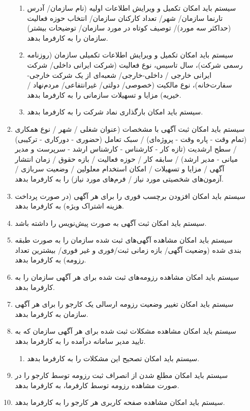 \documentclass[12pt]{article}
\begin{document}
\begin{itemize}
\begin{enumerate}
\begin{enumerate}
				\item سیستم باید امکان تکمیل و ویرایش اطلاعات اولیه (نام سازمان/ آدرس تارنما سازمان/ شهر/ تعداد کارکنان سازمان/ انتخاب حوزه فعالیت (حداکثر سه مورد)/ توصیف کوتاه در مورد سازمان/ توضیحات بیشتر) سازمان را به کارفرما بدهد.
				\item سیستم باید امکان تکمیل و ویرایش اطلاعات تکمیلی سازمان (روزنامه رسمی شرکت)، سال تاسیس، نوع فعالیت (شرکت ایرانی داخلی/ شرکت ایرانی خارجی / داخلی-خارجی/ شعبه‌ای از یک شرکت خارجی-سفارت‌خانه)، نوع مالکیت (خصوصی/ دولتی/ غیرانتفاعی/ مردم‌نهاد / خیریه) مزایا و تسهیلات سازمانی را به کارفرما بدهد.
				\item سیستم باید امکان بارگذاری نماد شرکت را به کارفرما بدهد.
			\end{enumerate}
			\item سیستم باید امکان ثبت آگهی با مشخصات (عنوان شغلی / شهر / نوع همکاری (تمام وقت - پاره وقت - پروژه‌ای) / سبک تعامل (حضوری - دورکاری - ترکیبی) / سطح ارشدیت (تازه کار - کارشناس - کارشناس ارشد - سرپرست و مدیر میانی - مدیر ارشد) / سابقه کار / حوزه فعالیت / بازه حقوق / زمان انتشار آگهی / مزایا و تسهیلات / امکان استخدام معلولین / وضعیت سربازی / آزمون‌های شخصیتی مورد نیاز / فرم‌های مورد نیاز) را به کارفرما بدهد.
			\item سیستم باید امکان افزودن برچسب فوری را برای هر آگهی (در صورت پرداخت هزینه اشتراک ویژه) به کارفرما بدهد.
			\item سیستم باید امکان ثبت آگهی به صورت پیش‌نویس را داشته باشد.
			\item سیستم باید امکان مشاهده آگهی‌های ثبت شده سازمان را به صورت طبقه بندی شده (وضعیت آگهی/ بازه زمانی ثبت/فوری و غیر فوری/ بیشترین تعداد رزومه) به کارفرما بدهد.
			\item سیستم باید امکان مشاهده رزومه‌های ثبت شده برای هر آگهی سازمان را به کارفرما بدهد.
			\item سیستم باید امکان تغییر وضعیت رزومه ارسالی یک کارجو را برای هر آگهی سازمان به کارفرما بدهد.
			\item سیستم باید امکان مشاهده مشکلات ثبت شده برای هر آگهی سازمان که به تایید مدیر سامانه درآمده را به کارفرما بدهد.
			\begin{enumerate}
				\renewcommand{\labelenumii}{-R\arabic{enumi}.\arabic{enumii}}
				\item سیستم باید امکان تصحیح این مشکلات را به کارفرما بدهد.
			\end{enumerate}
			\item سیستم باید امکان مطلع شدن از انصراف ثبت رزومه توسط کارجو را در صورت مشاهده رزومه توسط کارفرما، به کارفرما بدهد.
			\item سیستم باید امکان مشاهده صفحه کاربری هر کارجو را به کارفرما بدهد.

\end{enumerate}
\end{itemize}
\end{document}
